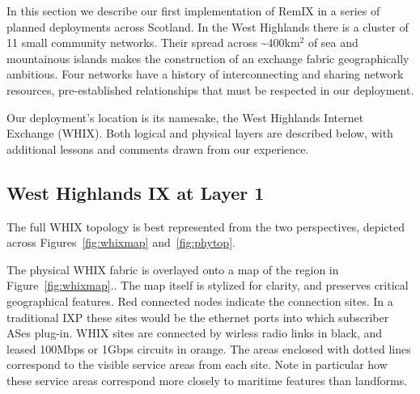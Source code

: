 
In this section we describe our first implementation of RemIX in a series of planned deployments across Scotland. In the West Highlands there
is a cluster of
11 small community networks. Their spread across \textasciitilde 400km$^2$
 of sea and mountainous islands makes the
construction of an exchange fabric geographically ambitious. Four networks have
a history of interconnecting and sharing network resources, pre-established
relationships that must be respected in our deployment.

Our deployment's location is its namesake, the West Highlands Internet
Exchange (WHIX). Both logical and physical layers are described below, with
additional lessons and comments drawn from our experience.



\subsection{West Highlands IX at Layer 1}

The full WHIX topology is best represented from the two perspectives, depicted
across Figures~\ref{fig:whixmap} and~\ref{fig:phytop}.

The physical WHIX fabric is overlayed onto a map of the region in
Figure~\ref{fig:whixmap}.. The map itself is stylized for clarity, and preserves
critical geographical features. Red connected nodes indicate the connection
sites. In a traditional IXP these sites would be the ethernet ports into which
subscriber ASes plug-in. WHIX sites are connected by wirless radio links in
black, and leased 100Mbps or 1Gbps circuits in orange. The areas enclosed with
dotted lines correspond to the visible service areas from each site.
 Note in particular how these service areas
correspond more  closely to maritime features than landforms.

